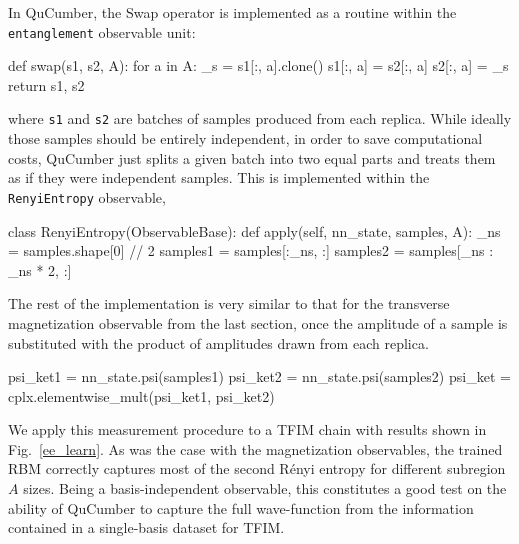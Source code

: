 \documentclass[submission, Phys, hidelnks]{SciPost}
\begin{document}
In QuCumber, the Swap operator is implemented as a routine within the
\verb|entanglement| observable unit:
\begin{python}
def swap(s1, s2, A):
    for a in A:
        _s = s1[:, a].clone()
        s1[:, a] = s2[:, a]
        s2[:, a] = _s
    return s1, s2
\end{python}
where \verb|s1| and \verb|s2| are batches of samples produced from each replica.
While ideally those samples should be entirely independent, in order to save
computational costs, QuCumber just splits a given batch into two equal parts and
treats them as if they were independent samples. This is implemented within the
\verb|RenyiEntropy| observable,
\begin{python}
class RenyiEntropy(ObservableBase):
    def apply(self, nn_state, samples, A):
        _ns = samples.shape[0] // 2
        samples1 = samples[:_ns, :]
        samples2 = samples[_ns : _ns * 2, :]
\end{python}
The rest of the implementation is very similar to that for the transverse
magnetization observable from the last section, once the amplitude of a sample
is substituted with the product of amplitudes drawn from each replica.
\begin{python}
psi_ket1 = nn_state.psi(samples1)
psi_ket2 = nn_state.psi(samples2)
psi_ket = cplx.elementwise_mult(psi_ket1, psi_ket2)
\end{python}

We apply this measurement procedure to a TFIM chain with results shown in
Fig.~\ref{ee_learn}. As was the case with the magnetization observables, the trained 
RBM correctly captures  most of the second R\'enyi entropy for different subregion 
$A$ sizes. Being a basis-independent observable, this constitutes a good test on
the ability of QuCumber to capture the full wave-function from the information contained
in a single-basis dataset for TFIM.
\end{document}
